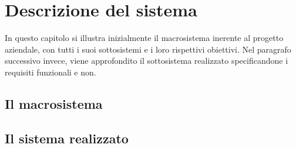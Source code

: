 \chapter{Descrizione del sistema}
\label{scenario}
In questo capitolo si illustra inizialmente il macrosistema inerente al progetto aziendale, con tutti i suoi sottosistemi e i loro rispettivi obiettivi. Nel paragrafo successivo invece, viene approfondito il sottosistema realizzato specificandone i requisiti funzionali e non. 


\section{Il macrosistema}



\section{Il sistema realizzato}